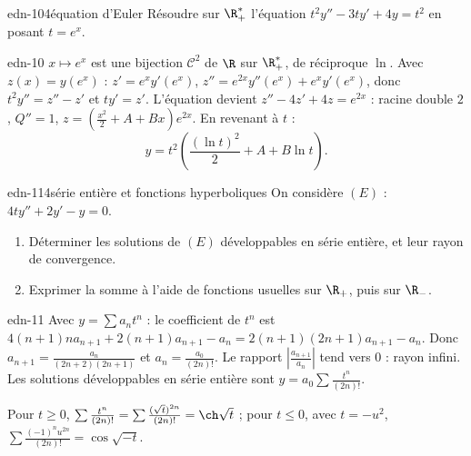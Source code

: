 \begin{exo}{edn-10}{4}{équation d'Euler}
Résoudre sur $\R_+^*$ l'équation $t^2y''-3ty'+4y=t^2$ en posant $t=e^x$.
\end{exo}
\begin{corrige}{edn-10}
$x\mapsto e^x$ est une bijection $\mathcal C^2$ de $\R$ sur $\R_+^*$, de réciproque $\ln$. Avec $z(x)=y(e^x)$ :
$z'=e^xy'(e^x)$, $z''=e^{2x}y''(e^x)+e^xy'(e^x)$, donc $t^2y''=z''-z'$ et $ty'=z'$. L'équation devient
$z''-4z'+4z=e^{2x}$ : racine double $2$, $Q''=1$, $z=\left(\frac{x^2}2+A+Bx\right)e^{2x}$. En revenant à $t$ :
\[y=t^2\left(\frac{(\ln t)^2}2+A+B\ln t\right).\]
\end{corrige}

\begin{exo}{edn-11}{4}{série entière et fonctions hyperboliques}
On considère $(E)$ : $4ty''+2y'-y=0$.
\begin{enumerate}
\item Déterminer les solutions de $(E)$ développables en série entière, et leur rayon de convergence.
\item Exprimer la somme à l'aide de fonctions usuelles sur $\R_+$, puis sur $\R_-$.
\end{enumerate}
\end{exo}
\begin{corrige}{edn-11}
 Avec $y=\sum a_nt^n$ : le coefficient de $t^n$ est $4(n+1)na_{n+1}+2(n+1)a_{n+1}-a_n=2(n+1)(2n+1)a_{n+1}-a_n$. Donc
$a_{n+1}=\frac{a_n}{(2n+2)(2n+1)}$ et $a_n=\frac{a_0}{(2n)!}$. Le rapport $\left|\frac{a_{n+1}}{a_n}\right|$ tend vers $0$ : rayon infini.
Les solutions développables en série entière sont $y=a_0\sum\frac{t^n}{(2n)!}$.

 Pour $t\geq0$, $\sum\frac{t^n}{(2n)!}=\sum\frac{(\sqrt t)^{2n}}{(2n)!}=\ch\sqrt t$ ; pour $t\leq0$, avec $t=-u^2$,
$\sum\frac{(-1)^nu^{2n}}{(2n)!}=\cos\sqrt{-t}$.
\end{corrige}

